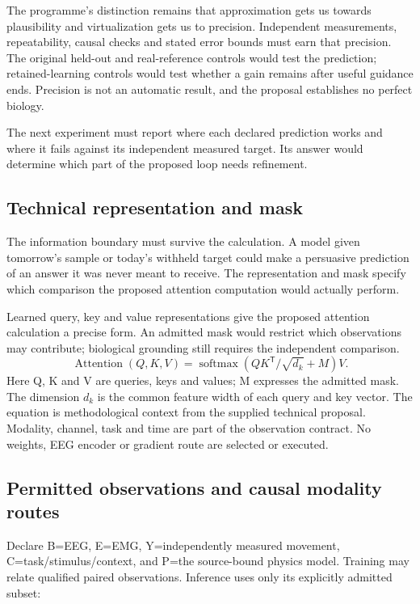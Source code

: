 The programme's distinction remains that approximation gets us towards
plausibility and virtualization gets us to precision. Independent measurements,
repeatability, causal checks and stated error bounds must earn that precision.
The original held-out and real-reference controls would test the prediction;
retained-learning controls would test whether a gain remains after useful
guidance ends. Precision is not an automatic result, and the proposal establishes
no perfect biology.

The next experiment must report where each declared prediction works and where
it fails against its independent measured target. Its answer would determine
which part of the proposed loop needs refinement.

\subsection{Technical representation and mask}
The information boundary must survive the calculation. A model given tomorrow's
sample or today's withheld target could make a persuasive prediction of an
answer it was never meant to receive. The representation and mask specify
which comparison the proposed attention computation would actually perform.

Learned query, key and value representations give the proposed attention
calculation a precise form. An admitted mask would restrict which observations
may contribute; biological grounding still requires the independent comparison.
\[\operatorname{Attention}(Q,K,V)=\operatorname{softmax}\!\left(QK^{\mathsf{T}}/\sqrt{d_k}+M\right)V.\]
Here Q, K and V are queries, keys and values; M expresses the admitted mask. The dimension $d_k$ is the common feature width of each query and key vector. The equation is methodological context from the supplied technical proposal. Modality, channel, task and time are part of the observation contract. No weights, EEG encoder or gradient route are selected or executed.

\subsection{Permitted observations and causal modality routes}
Declare B=EEG, E=EMG, Y=independently measured movement, C=task/stimulus/context, and P=the source-bound physics model. Training may relate qualified paired observations. Inference uses only its explicitly admitted subset:

